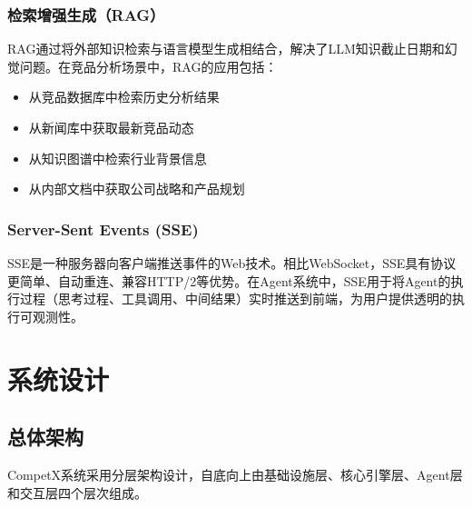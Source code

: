 \documentclass[12pt,a4paper]{ctexrep}
\begin{document}
\subsection{检索增强生成（RAG）}

RAG\cite{rag2020}通过将外部知识检索与语言模型生成相结合，解决了LLM知识截止日期和幻觉问题。在竞品分析场景中，RAG的应用包括：

\begin{itemize}[leftmargin=2em]
\item 从竞品数据库中检索历史分析结果
\item 从新闻库中获取最新竞品动态
\item 从知识图谱中检索行业背景信息
\item 从内部文档中获取公司战略和产品规划
\end{itemize}

\subsection{Server-Sent Events (SSE)}

SSE\cite{sse2015}是一种服务器向客户端推送事件的Web技术。相比WebSocket，SSE具有协议更简单、自动重连、兼容HTTP/2等优势。在Agent系统中，SSE用于将Agent的执行过程（思考过程、工具调用、中间结果）实时推送到前端，为用户提供透明的执行可观测性。

\chapter{系统设计}

\section{总体架构}

CompetX系统采用分层架构设计，自底向上由基础设施层、核心引擎层、Agent层和交互层四个层次组成。
\end{document}
